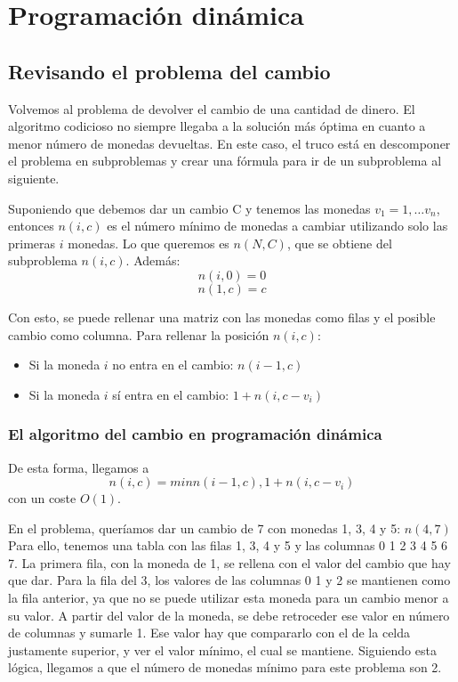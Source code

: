 \chapter{Programación dinámica}
\section{Revisando el problema del cambio}
Volvemos al problema de devolver el cambio de una cantidad de dinero. El algoritmo codicioso no siempre llegaba a la solución más óptima en cuanto a menor número de monedas devueltas. 
En este caso, el truco está en descomponer el problema en subproblemas y crear una fórmula para ir de un subproblema al siguiente.

Suponiendo que debemos dar un cambio C y tenemos las monedas $v_1 = 1, \ldots v_n$, entonces $n(i, c)$ es el número mínimo de monedas a cambiar utilizando solo las primeras $i$ monedas. Lo que queremos es $n(N, C)$, que se obtiene del subproblema $n(i, c)$. Además:
$$n(i,0) = 0$$
$$n(1,c) = c$$

Con esto, se puede rellenar una matriz con las monedas como filas y el posible cambio como columna. Para rellenar la posición $n(i,c)$:
\begin{itemize}
\item Si la moneda $i$ no entra en el cambio: $n(i - 1, c)$
\item Si la moneda $i$ sí entra en el cambio: $1 + n(i, c - v_i)$
\end{itemize}

\subsection{El algoritmo del cambio en programación dinámica}
De esta forma, llegamos a
$$n(i, c) = min{n(i - 1, c), 1 + n(i, c - v_i)}$$
con un coste $O(1)$.

En el problema, queríamos dar un cambio de 7 con monedas 1, 3, 4 y 5: $n(4, 7)$ Para ello, tenemos una tabla con las filas 1, 3, 4 y 5 y las columnas 0 1 2 3 4 5 6 7. La primera fila, con la moneda de 1, se rellena con el valor del cambio que hay que dar. Para la fila del 3, los valores de las columnas 0 1 y 2 se mantienen como la fila anterior, ya que no se puede utilizar esta moneda para un cambio menor a su valor. A partir del valor de la moneda, se debe retroceder ese valor en número de columnas y sumarle 1. Ese valor hay que compararlo con el de la celda justamente superior, y ver el valor mínimo, el cual se mantiene. Siguiendo esta lógica, llegamos a que el número de monedas mínimo para este problema son 2.

